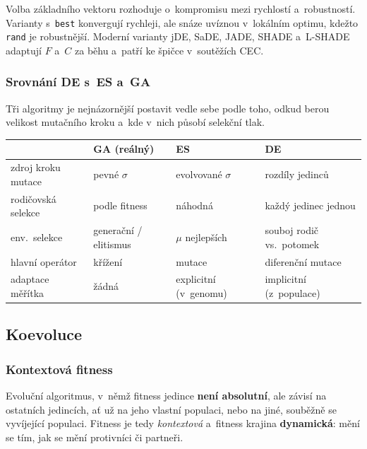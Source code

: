 \documentclass[11pt,a4paper]{article}
\theoremstyle{definition}
\begin{document}
Volba základního vektoru rozhoduje o~kompromisu mezi rychlostí a~robustností. Varianty
s~\texttt{best} konvergují rychleji, ale snáze uvíznou v~lokálním optimu, kdežto \texttt{rand}
je robustnější. Moderní varianty jDE, SaDE, JADE, SHADE a~L-SHADE adaptují $F$ a~$C$ za běhu
a~patří ke špičce v~soutěžích CEC.

\subsubsection{Srovnání DE s~ES a~GA}

Tři algoritmy je nejnázornější postavit vedle sebe podle toho, odkud berou velikost mutačního
kroku a~kde v~nich působí selekční tlak.

\begin{center}
\begin{tabular}{@{}p{3.2cm}p{3.7cm}p{3.7cm}p{3.7cm}@{}}
\toprule
 & \textbf{GA (reálný)} & \textbf{ES} & \textbf{DE} \\
\midrule
zdroj kroku mutace & pevné $\sigma$ & evolvované $\sigma$ & rozdíly jedinců \\
rodičovská selekce & podle fitness & náhodná & každý jedinec jednou \\
env.\ selekce & generační / elitismus & $\mu$ nejlepších & souboj rodič vs.\ potomek \\
hlavní operátor & křížení & mutace & diferenční mutace \\
adaptace měřítka & žádná & explicitní (v~genomu) & implicitní (z~populace) \\
\bottomrule
\end{tabular}
\end{center}

\subsection{Koevoluce}
\label{sec:koevoluce}
\subsubsection{Kontextová fitness}

\begin{defbox}
Evoluční algoritmus, v~němž fitness jedince \textbf{není absolutní}, ale závisí na ostatních
jedincích, ať už na jeho vlastní populaci, nebo na jiné, souběžně se vyvíjející populaci.
Fitness je tedy \emph{kontextová} a~fitness krajina \textbf{dynamická}: mění se tím, jak se
mění protivníci či partneři.
\end{defbox}
\end{document}
